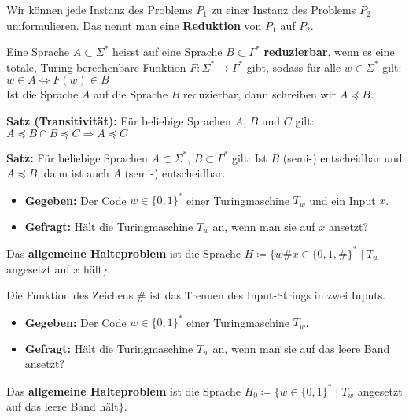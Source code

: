 
Wir können jede Instanz des Problems $P_1$ zu einer Instanz des Problems $P_2$ umformulieren.
Das nennt man eine \textbf{Reduktion} von $P_1$ auf $P_2$.

Eine Sprache $A \subset \Sigma^*$ heisst auf eine Sprache $B \subset \Gamma^*$ \textbf{reduzierbar}, wenn es eine totale, Turing-berechenbare Funktion $F: \Sigma^* \rightarrow \Gamma^*$ gibt, sodass für alle $w \in \Sigma^*$ gilt:\\
$w \in A \Leftrightarrow F(w) \in B$\\
Ist die Sprache $A$ auf die Sprache $B$ reduzierbar, dann schreiben wir $A \preceq B$.

\textbf{Satz (Transitivität):} Für beliebige Sprachen $A$, $B$ und $C$ gilt:\\
$A \preceq B \cap B \preceq C \Rightarrow A \preceq C$

\textbf{Satz:} Für beliebige Sprachen $A \subset \Sigma^*$, $B \subset \Gamma^*$ gilt: Ist $B$ (semi-) entscheidbar und $A \preceq B$, dann ist auch $A$ (semi-) entscheidbar.


\begin{itemize}[label={}]
    \item \textbf{Gegeben:} Der Code $w \in \{0,1\}^*$ einer Turingmaschine $T_w$ und ein Input $x$.
    \item \textbf{Gefragt:} Hält die Turingmaschine $T_w$ an, wenn man sie auf $x$ ansetzt?
\end{itemize}

Das \textbf{allgemeine Halteproblem} ist die Sprache $H \coloneqq \{ w \# x \in \{0,1,\#\}^* \mid T_w$ angesetzt auf $x$ hält$\}$.

Die Funktion des Zeichens \# ist das Trennen des Input-Strings in zwei Inputs.

\begin{itemize}[label={}]
    \item \textbf{Gegeben:} Der Code $w \in \{0,1\}^*$ einer Turingmaschine $T_w$.
    \item \textbf{Gefragt:} Hält die Turingmaschine $T_w$ an, wenn man sie auf das leere Band ansetzt?
\end{itemize}

Das \textbf{allgemeine Halteproblem} ist die Sprache $H_0 \coloneqq \{ w \in \{0,1\}^* \mid T_w$ angesetzt auf das leere Band hält$\}$.

